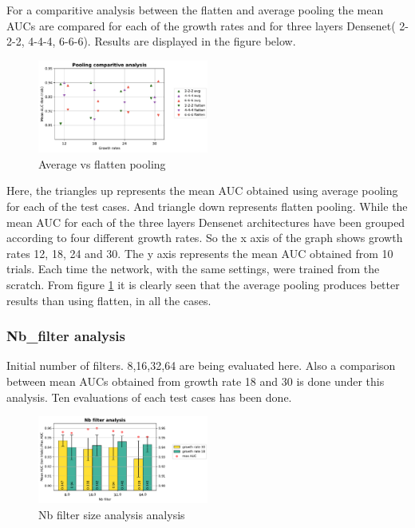 For a comparitive analysis between the flatten and average pooling the mean AUCs are compared for each of the growth rates and for three layers Densenet( 2-2-2, 4-4-4, 6-6-6). Results are displayed in the figure below.
\begin{figure}[h]
\centering
\includegraphics[width=0.5\textwidth]{images/densenet/simple/densenet_simple_three_layer_pooling_compare}
\caption{\label{fig:densenet_simple_three_layer_pooling_compare}Average vs flatten pooling}
\end{figure}

Here, the triangles up represents the mean AUC obtained using average pooling for each of the test cases. And triangle down represents flatten pooling. While the mean AUC for each of the three layers Densenet
architectures have been grouped according to four different growth rates. So the x axis of the graph shows growth rates 12, 18, 24 and 30. The y axis represents the mean AUC obtained from 10 trials. Each time 
the network, with the same settings, were trained from the scratch.
From figure \ref{fig:densenet_simple_three_layer_pooling_compare} it is clearly seen that the average pooling produces better results than using flatten, in all the cases. 

\subsubsection{Nb\_filter analysis}
Initial number of filters. 8,16,32,64 are being evaluated here. Also a comparison between mean AUCs obtained from growth rate 18 and 30 is done under this analysis. Ten evaluations of each test cases has been done.

\begin{figure}[ht]
\centering
\includegraphics[width=0.5\textwidth]{images/densenet/simple/densenet_simple_nb_filter}
\caption{\label{fig:densenet_simple_nb_filter}Nb filter size analysis analysis}
\end{figure}

